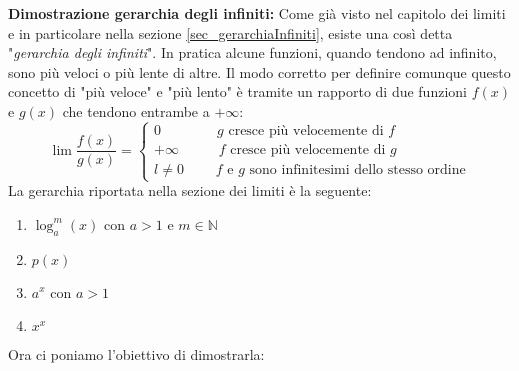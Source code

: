 \label{dim_gerarchiaInfiniti}
\textbf{Dimostrazione gerarchia degli infiniti:} Come già visto nel capitolo 
dei limiti e in particolare nella sezione \ref{sec_gerarchiaInfiniti}, esiste 
una così detta "\textit{gerarchia degli infiniti}". In pratica alcune funzioni, 
quando tendono ad infinito, sono più veloci o più lente di altre. Il modo 
corretto per definire comunque questo concetto di "più veloce" e "più lento" è 
tramite un rapporto di due funzioni $f(x)$ e $g(x)$ che tendono entrambe a 
$+\infty$:
\begin{equation*}
    \lim \dfrac{f(x)}{g(x)} =
    \begin{cases*}
        0 \qquad \qquad g \text{ cresce più velocemente di } f\\
        +\infty \qquad \;\;\; f \text{ cresce più velocemente di } g\\
        l \neq 0 \qquad \; \text{$f$ e $g$ sono infinitesimi dello stesso 
        ordine}
    \end{cases*}
\end{equation*}
La gerarchia riportata nella sezione dei limiti è la seguente:
\begin{enumerate}
	\item $\log_a^m (x)$ con $a > 1$ e $m \in \mathbb{N}$
	\item $p(x)$
	\item $a^x$ con $a > 1$
	\item $x^x$
\end{enumerate}
Ora ci poniamo l'obiettivo di dimostrarla:
